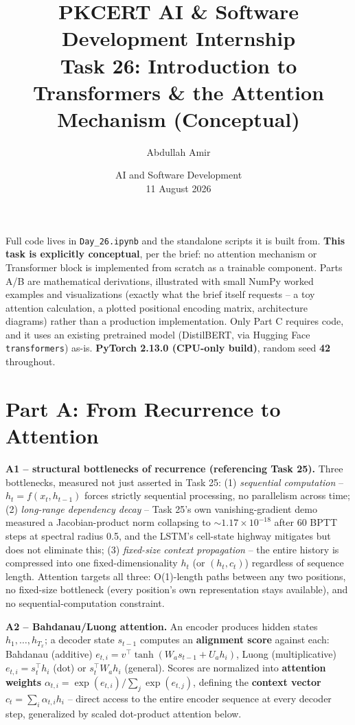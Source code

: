 \documentclass[11pt,a4paper]{article}
\title{\vspace{-1.5cm}\textbf{PKCERT AI \& Software Development Internship \\ Task 26: Introduction to Transformers \& the Attention Mechanism (Conceptual)}}
\author{Abdullah Amir}
\date{AI and Software Development \\ 11 August 2026}
\begin{document}
\maketitle
\vspace{-0.8cm}

Full code lives in \texttt{Day\_26.ipynb} and the standalone scripts it is built from.
\textbf{This task is explicitly conceptual}, per the brief: no attention mechanism or
Transformer block is implemented from scratch as a trainable component. Parts A/B are
mathematical derivations, illustrated with small NumPy worked examples and visualizations
(exactly what the brief itself requests -- a toy attention calculation, a plotted positional
encoding matrix, architecture diagrams) rather than a production implementation. Only Part C
requires code, and it uses an existing pretrained model (DistilBERT, via Hugging Face
\texttt{transformers}) as-is. \textbf{PyTorch 2.13.0 (CPU-only build)}, random seed
\textbf{42} throughout.

\section*{Part A: From Recurrence to Attention}

\textbf{A1 -- structural bottlenecks of recurrence (referencing Task 25).} Three bottlenecks,
measured not just asserted in Task 25: (1) \emph{sequential computation} -- $h_t=f(x_t,h_{t-1})$
forces strictly sequential processing, no parallelism across time; (2) \emph{long-range
dependency decay} -- Task 25's own vanishing-gradient demo measured a Jacobian-product norm
collapsing to $\sim1.17\times10^{-18}$ after 60 BPTT steps at spectral radius 0.5, and the
LSTM's cell-state highway mitigates but does not eliminate this; (3) \emph{fixed-size context
propagation} -- the entire history is compressed into one fixed-dimensionality $h_t$ (or
$(h_t,c_t)$) regardless of sequence length. Attention targets all three: O(1)-length paths
between any two positions, no fixed-size bottleneck (every position's own representation
stays available), and no sequential-computation constraint.

\textbf{A2 -- Bahdanau/Luong attention.} An encoder produces hidden states $h_1,\ldots,h_{T_x}$;
a decoder state $s_{t-1}$ computes an \textbf{alignment score} against each: Bahdanau
(additive) $e_{t,i}=v^\top\tanh(W_a s_{t-1}+U_a h_i)$, Luong (multiplicative)
$e_{t,i}=s_t^\top h_i$ (dot) or $s_t^\top W_a h_i$ (general). Scores are normalized into
\textbf{attention weights} $\alpha_{t,i}=\exp(e_{t,i})/\sum_j\exp(e_{t,j})$, defining the
\textbf{context vector} $c_t=\sum_i \alpha_{t,i}h_i$ -- direct access to the entire encoder
sequence at every decoder step, generalized by scaled dot-product attention below.
\end{document}
